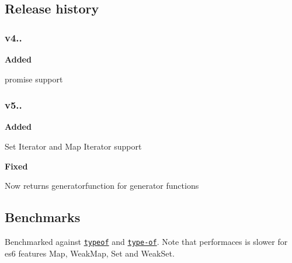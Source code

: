 \subsection*{Release history}

\subsubsection*{v4..}

{\bfseries Added}


\begin{DoxyItemize}
\item {\ttfamily promise} support
\end{DoxyItemize}

\subsubsection*{v5..}

{\bfseries Added}


\begin{DoxyItemize}
\item {\ttfamily Set Iterator} and {\ttfamily Map Iterator} support
\end{DoxyItemize}

{\bfseries Fixed}


\begin{DoxyItemize}
\item Now returns {\ttfamily generatorfunction} for generator functions
\end{DoxyItemize}

\subsection*{Benchmarks}

Benchmarked against \href{http://github.com/CodingFu/typeof}{\tt typeof} and \href{https://github.com/ForbesLindesay/type-of}{\tt type-\/of}. Note that performaces is slower for es6 features {\ttfamily Map}, {\ttfamily Weak\+Map}, {\ttfamily Set} and {\ttfamily Weak\+Set}.


